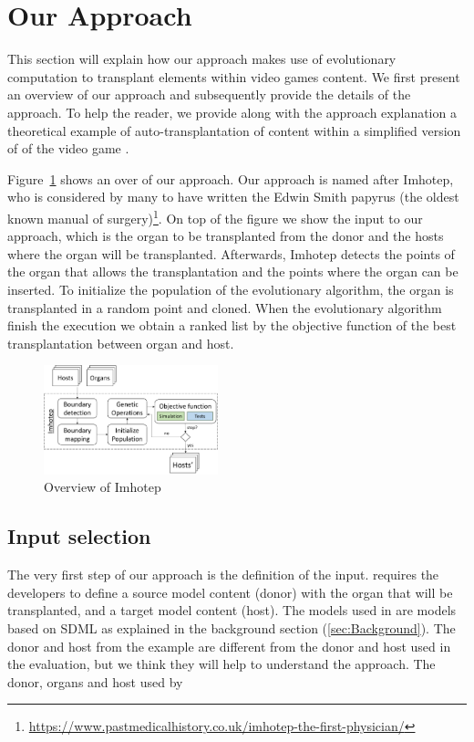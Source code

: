 \section{Our \ApproachName{} Approach} 
\label{sec:Approach}

This section will explain how our approach makes use of evolutionary computation to transplant elements within video games content. We first present an overview of our approach and subsequently provide the details of
the approach. To help the reader, we provide along with the approach explanation a theoretical example of auto-transplantation of content within a simplified version of  of the video game \CaseStudy{}.

Figure~\ref{fig:approach} shows an over of our approach.
Our approach is named after Imhotep, who is considered by many to have written the Edwin Smith papyrus (the oldest known manual of surgery)\footnote{\url{https://www.pastmedicalhistory.co.uk/imhotep-the-first-physician/}}.
On top of the figure we show the input to our approach, which is the organ to be transplanted from the donor and the hosts where the organ will be transplanted. Afterwards, Imhotep detects the points of the organ that allows the transplantation and the points where the organ can be inserted. To initialize the population of the evolutionary algorithm, the organ is transplanted in a random point and cloned. When the evolutionary algorithm finish the execution we obtain a ranked list by the objective function of the best transplantation between organ and host.

\begin{figure}[h]
    \centering
    \includegraphics[width=0.45\textwidth]{Figures/overview.png}
    \caption{Overview of Imhotep}
    \label{fig:approach}
\end{figure}


\subsection{Input selection}

The very first step of our approach is the definition of the input. \ApproachName{} requires the developers to define a source model content (donor) with the organ that will be transplanted, and a target model content (host). The models used in \ApproachName{} are models based on SDML as explained in the background section (\ref{sec:Background}). The donor and host from the example are different from the donor and host used in the evaluation, but we think they will help to understand the approach. The donor, organs and host used by \ApproachName{}

